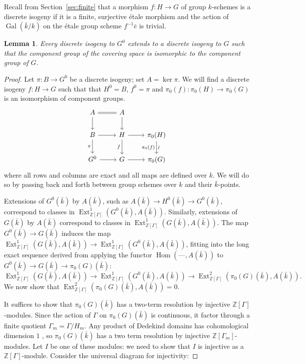 \documentclass[11pt]{amsart}
\theoremstyle{plain}
\newtheorem{lemma}[theorem]{Lemma}
\theoremstyle{definition}
\theoremstyle{remark}
\newcommand{\ZZ}{{\mathbb{Z}}}
\newcommand{\bFq}{\bar{k}}
\newcommand{\Fq}{k}
\DeclareMathOperator{\Gal}{Gal}
\DeclareMathOperator{\Hom}{Hom}
\DeclareMathOperator{\Ext}{Ext}
\newcommand\David[1]{\marginpar{\smaller\smaller DR: #1}}
\begin{document}
Recall from Section~\ref{sec:finite} that 
a morphism $f : H\to G$ of group $\Fq$-schemes is a discrete isogeny 
if it is a finite, surjective \'etale morphism and 
the action of $\Gal(\bFq/\Fq)$ on the \'etale group scheme $f^{-1}{\bar e}$ is trivial.

\begin{lemma}\label{lemma:ext}
Every discrete isogeny  to $G^0$ extends to a discrete
isogeny to $G$ such that the component group of the covering space is isomorphic
to the component group of $G$.
\end{lemma}

\begin{proof}
Let $\pi: B \to G^0$ be a discrete isogeny; set $A = \ker \pi$.
  We will find a discrete isogeny $f: H\to G$
  such that that $H^0 = B$, $f^0 =\pi$ and
  $\pi_0(f) : \pi_0(H)\to \pi_0(G)$ is an isomorphism of component
  groups.
  \begin{equation}\label{extension-diagram}
  \begin{tikzcd}
  A \arrow[equal]{r} \dar & A \dar \\
  B \rar \dar[swap]{\pi} & H \rar \dar[swap]{f} & \pi_0(H) \arrow{d}[below,rotate=90]{\sim}[swap]{\pi_0(f)} \\
  G^0 \rar & G \rar & \pi_0(G)
  \end{tikzcd}
  \end{equation}
  where all rows and columns are exact and all maps are defined over
  $\Fq$.  We will do so by passing back and forth between group
  schemes over $\Fq$ and their $\bFq$-points.  
  
  Extensions of
  $G^0(\bFq)$ by $A(\bFq)$, such as $A(\bFq) \to H^0(\bFq) \to G^0(\bFq)$,
  correspond to classes in $\Ext^1_{\ZZ[\Gamma]}(G^0(\bFq), A(\bFq))$.
  Similarly, extensions of $G(\bFq)$ by $A(\bFq)$ correspond to
  classes in $\Ext^1_{\ZZ[\Gamma]}(G(\bFq), A(\bFq))$.  The map
  $G^0(\bFq) \to G(\bFq)$ induces the map
  $\Ext^1_{\ZZ[\Gamma]}(G(\bFq), A(\bFq)) \to \Ext^1_{\ZZ[\Gamma]}(G^0(\bFq), A(\bFq))$,
  fitting into the long exact sequence derived from applying
  the functor $\Hom(\mbox{---}, A(\bFq))$ to $G^0(\bFq) \to G(\bFq) \to \pi_0(G)(\bFq)$:
  \[
  \Ext^1_{\ZZ[\Gamma]}(G(\bFq), A(\bFq)) \to \Ext^1_{\ZZ[\Gamma]}(G^0(\bFq), A(\bFq)) \to \Ext^2_{\ZZ[\Gamma]}(\pi_0(G)(\bFq), A(\bFq)).
  \]
  We now show that $\Ext^2_{\ZZ[\Gamma]}(\pi_0(G)(\bFq), A(\bFq)) = 0$.

  It suffices to show that $\pi_0(G)(\bFq)$ has a two-term resolution
  by injective $\ZZ[\Gamma]$-modules.  Since the action of $\Gamma$ on
  $\pi_0(G)(\bFq)$ is continuous, it factor through a finite quotient
  $\Gamma_m = \Gamma / H_m$.  Any product of Dedekind domains has
  cohomological dimension $1$ \David{Add a citation for this fact}, so $\pi_0(G)(\bFq)$ has a
  two term resolution by injective $\ZZ[\Gamma_m]$-modules.  Let $I$
  be one of these modules: we need to show that $I$ is injective as a
  $\ZZ[\Gamma]$-module.  Consider the universal diagram for injectivity:
  

\end{proof}
\end{document}
